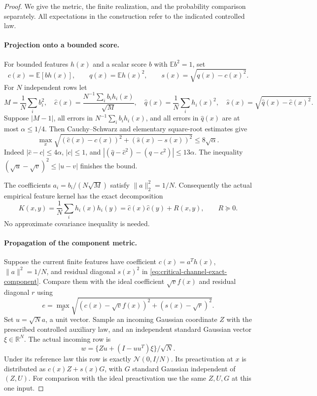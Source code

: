 \begin{proof}
We give the metric, the finite realization, and the probability comparison
separately.  All expectations in the construction refer to the indicated
controlled law.

\paragraph{Projection onto a bounded score.}
For bounded features $h(x)$ and a scalar score $b$ with
$\mathbb E b^2=1$, set
\[
 c(x)=\mathbb E[bh(x)],\qquad
 q(x)=\mathbb E h(x)^2,\qquad
 s(x)=\sqrt{q(x)-c(x)^2}.
\]
For $N$ independent rows let
\[
 M=\frac1N\sum_i b_i^2,\quad
 \widehat c(x)=\frac{N^{-1}\sum_i b_i h_i(x)}{\sqrt M},\quad
 \widehat q(x)=\frac1N\sum_i h_i(x)^2,
 \quad \widehat s(x)=\sqrt{\widehat q(x)-\widehat c(x)^2}.
\]
Suppose $|M-1|$, all errors in $N^{-1}\sum_i b_i h_i(x)$,
and all errors in $\widehat q(x)$ are at most $\alpha\le1/4$.
Then Cauchy--Schwarz and elementary square-root estimates give
\begin{equation}\label{eq:critical-channel-sampling-metric}
 \max_x\sqrt{(\widehat c(x)-c(x))^2+
                         (\widehat s(x)-s(x))^2}
       \le8\sqrt\alpha.
\end{equation}
Indeed $|\widehat c-c|\le4\alpha$, $|c|\le1$, and
$|(\widehat q-\widehat c^2)-(q-c^2)|\le13\alpha$.
The inequality $(\sqrt u-\sqrt v)^2\le|u-v|$ finishes the bound.

The coefficients $a_i=b_i/(N\sqrt M)$ satisfy
$\|a\|_2^2=1/N$.  Consequently the actual empirical feature kernel
has the exact decomposition
\begin{equation}\label{eq:critical-channel-exact-component}
 K(x,y)=\frac1N\sum_i h_i(x)h_i(y)
       =\widehat c(x)\widehat c(y)+R(x,y),\qquad R\succeq0.
\end{equation}
No approximate covariance inequality is needed.

\paragraph{Propagation of the component metric.}
Suppose the current finite features have coefficient $c(x)=a^Th(x)$,
$\|a\|^2=1/N$, and residual diagonal $s(x)^2$ in
\eqref{eq:critical-channel-exact-component}.  Compare them with the
ideal coefficient $\sqrt v f(x)$ and residual diagonal $r$ using
\[
 e=\max_x\sqrt{(c(x)-\sqrt v f(x))^2+(s(x)-\sqrt r)^2}.
\]
Set $u=\sqrt N a$, a unit vector.  Sample an incoming Gaussian
coordinate $Z$ with the prescribed controlled auxiliary law, and an
independent standard Gaussian vector $\xi\in\mathbb R^N$.  The
actual incoming row is
\[
 w=\{Zu+(I-uu^T)\xi\}/\sqrt N.
\]
Under its reference law this row is exactly $\mathcal N(0,I/N)$.
Its preactivation at $x$ is distributed as $c(x)Z+s(x)G$, with $G$
standard Gaussian independent of $(Z,U)$.  For comparison with the
ideal preactivation use the same $Z,U,G$ at this one input.


\end{proof}
